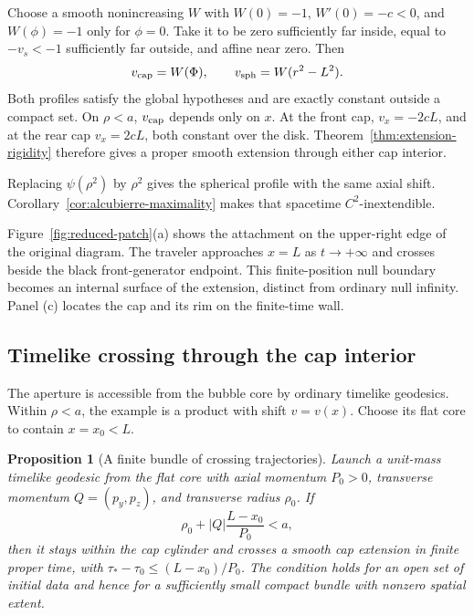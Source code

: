\documentclass[10pt]{article}
\newtheorem{proposition}[theorem]{Proposition}
\begin{document}
Choose a smooth nonincreasing \(W\) with \(W(0)=-1\), \(W'(0)=-c<0\), and
\(W(\phi)=-1\) only for \(\phi=0\).  Take it to be zero sufficiently far
inside, equal to \(-v_s<-1\) sufficiently far outside, and affine near zero.
Then
\begin{equation}
  v_{\rm cap}=W(\Phi),\qquad v_{\rm sph}=W(r^2-L^2).
  \label{eq:matched-figure-profiles}
\end{equation}
Both profiles satisfy the global hypotheses and are exactly constant outside a compact
set.  On \(\rho<a\), \(v_{\rm cap}\) depends only on \(x\).  At the front cap,
\(v_x=-2cL\), and at the rear cap \(v_x=2cL\), both constant over the disk.
Theorem~\ref{thm:extension-rigidity} therefore gives a proper smooth
extension through either cap interior.

Replacing \(\psi(\rho^2)\) by \(\rho^2\) gives the spherical profile with the
same axial shift.  Corollary~\ref{cor:alcubierre-maximality} makes that spacetime
\(C^2\)-inextendible.

Figure~\ref{fig:reduced-patch}(a) shows the attachment on the upper-right edge
of the original diagram.  The traveler approaches \(x=L\) as
\(t\to+\infty\) and crosses beside the black front-generator endpoint.
This finite-position null boundary becomes an internal surface of the
extension, distinct from ordinary null infinity.  Panel (c) locates the
cap and its rim on the finite-time wall.


\subsection{Timelike crossing through the cap interior}

The aperture is accessible from the bubble core by ordinary timelike
geodesics.  Within \(\rho<a\), the example is a product with shift \(v=v(x)\).
Choose its flat core to contain \(x=x_0<L\).

\begin{proposition}[A finite bundle of crossing trajectories]
\label{prop:timelike-cap-crossing}
Launch a unit-mass timelike geodesic from the flat core with axial momentum
\(P_0>0\), transverse momentum \(Q=(p_y,p_z)\), and transverse radius
\(\rho_0\).  If
\begin{equation}
  \rho_0+|Q|\frac{L-x_0}{P_0}<a,
  \label{eq:cap-aperture}
\end{equation}
then it stays within the cap cylinder and crosses a smooth cap extension in
finite proper time, with
\(\tau_*-\tau_0\leq(L-x_0)/P_0\).
The condition holds for an open set of initial data and hence for a sufficiently
small compact bundle with nonzero spatial extent.
\end{proposition}
\end{document}
